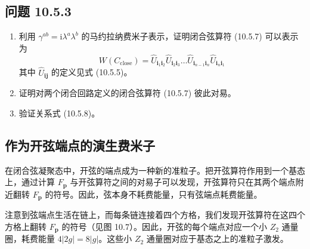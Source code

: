 \subsection*{问题 10.5.3}

\begin{enumerate}
\item 利用 $\gamma^{ab}=\mathrm{i}\lambda^{a}\lambda^{b}$ 的马约拉纳费米子表示，证明闭合弦算符 (10.5.7) 可以表示为
\begin{equation*}
W(C_{\text{close}})=\hat U_{\pmb{i}_1\pmb{i}_2}\hat U_{\pmb{i}_2\pmb{i}_3}\dots\hat U_{\pmb{i}_{n-1}\pmb{i}_n}\hat U_{\pmb{i}_n\pmb{i}_1}
\end{equation*}
其中 $\hat U_{\pmb{i}\pmb{j}}$ 的定义见式 (10.5.5)。
\item 证明对两个闭合回路定义的闭合弦算符 (10.5.7) 彼此对易。
\item 验证关系式 (10.5.8)。
\end{enumerate}

\subsection{作为开弦端点的演生费米子}

在闭合弦凝聚态中，开弦的端点成为一种新的准粒子。把开弦算符作用到一个基态上，通过计算 $F_{\pmb{p}}$ 与开弦算符之间的对易子可以发现，开弦算符只在其两个端点附近翻转 $F_{\pmb{p}}$ 的符号。因此，弦本身不耗费能量，只有弦端点耗费能量。

注意到弦端点生活在链上，而每条链连接着四个方格，我们发现开弦算符在这四个方格上翻转 $F_{\pmb{p}}$ 的符号（见图 10.7）。因此，开弦的每个端点对应一个小 $Z_2$ 通量圈，耗费能量 $4|2g|=8|g|$。这些小 $Z_2$ 通量圈对应于基态之上的准粒子激发。

